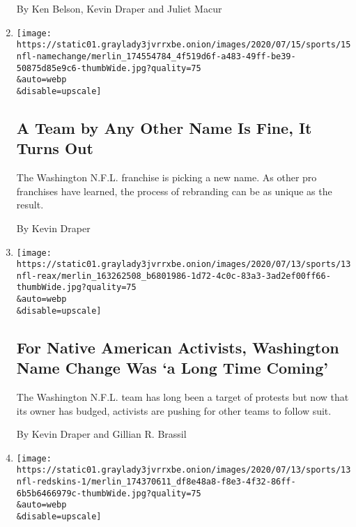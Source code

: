 \begin{enumerate}
  By Ken Belson, Kevin Draper and Juliet Macur
\item
  \href{/2020/07/16/sports/football/washington-name-change-trademark.html}{}

  \texttt{[image: https://static01.graylady3jvrrxbe.onion/images/2020/07/15/sports/15nfl-namechange/merlin\_174554784\_4f519d6f-a483-49ff-be39-50875d85e9c6-thumbWide.jpg?quality=75\\\&auto=webp\\\&disable=upscale]}

  \hypertarget{a-team-by-any-other-name-is-fine-it-turns-out}{%
  \subsection{A Team by Any Other Name Is Fine, It Turns
  Out}\label{a-team-by-any-other-name-is-fine-it-turns-out}}

  The Washington N.F.L. franchise is picking a new name. As other pro
  franchises have learned, the process of rebranding can be as unique as
  the result.

  By Kevin Draper
\item
  \href{/2020/07/13/sports/football/native-american-washington-name-change.html}{}

  \texttt{[image: https://static01.graylady3jvrrxbe.onion/images/2020/07/13/sports/13nfl-reax/merlin\_163262508\_b6801986-1d72-4c0c-83a3-3ad2ef00ff66-thumbWide.jpg?quality=75\\\&auto=webp\\\&disable=upscale]}

  \hypertarget{for-native-american-activists-washington-name-change-was-a-long-time-coming}{%
  \subsection{For Native American Activists, Washington Name Change Was
  `a Long Time
  Coming'}\label{for-native-american-activists-washington-name-change-was-a-long-time-coming}}

  The Washington N.F.L. team has long been a target of protests but now
  that its owner has budged, activists are pushing for other teams to
  follow suit.

  By Kevin Draper and Gillian R. Brassil
\item
  \href{/2020/07/13/sports/football/washington-redskins-new-name.html}{}

  \texttt{[image: https://static01.graylady3jvrrxbe.onion/images/2020/07/13/sports/13nfl-redskins-1/merlin\_174370611\_df8e48a8-f8e3-4f32-86ff-6b5b6466979c-thumbWide.jpg?quality=75\\\&auto=webp\\\&disable=upscale]}


\end{enumerate}
